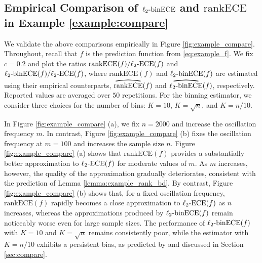 \documentclass[11pt]{article}
\numberwithin{equation}{section}
\theoremstyle{definition}
\newcommand{\myoverline}[2][3.5em]{%
  \overset{%
    \tikz[baseline=-0.1ex]{
      \draw[line width=0.75pt]
        (0,0) .. controls (#1/2,0.5ex) .. (#1,0);
    }%
  }{#2}%
}
\newcommand{\ECE}{\mathrm{ECE}}
\newcommand{\lECE}{\ell_2\textnormal{-}\ECE}
\newcommand{\binECE}{\mathrm{binECE}}
\newcommand{\lbinECE}{\ell_2\textnormal{-}\binECE}
\newcommand{\binhatECE}{\myoverline{\lbinECE}}
\newcommand{\rankECE}{\mathrm{rankECE}}
\newcommand{\hatrankECE}{\myoverline{\rankECE}}
\begin{document}
\subsection{Empirical Comparison of $\lbinECE$ and $\rankECE$ in Example \ref{example:compare}}
We validate the above comparisons empirically in Figure \ref{fig:example_compare}. Throughout, recall that $f$ is the prediction function from \eqref{eq:example_f}. We fix $c=0.2$ and plot the ratios $\rankECE(f)/\lECE(f)$ and $\lbinECE(f)/\lECE(f)$, where $\rankECE(f)$ and $\lbinECE(f)$ are estimated using their empirical counterparts, $\hatrankECE(f)$ and $\binhatECE(f)$, respectively. Reported values are averaged over $50$ repetitions. For the binning estimator, we consider three choices for the number of bins: $K=10$, $K=\sqrt{n}$, and $K=n/10$.

In Figure \ref{fig:example_compare} (a), we fix $n=2000$ and increase the oscillation frequency $m$. In contrast, Figure \ref{fig:example_compare} (b) fixes the oscillation frequency at $m=100$ and increases the sample size $n$. Figure \ref{fig:example_compare} (a) shows that $\rankECE(f)$ provides a substantially better approximation to $\lECE(f)$ for moderate values of $m$. As $m$ increases, however, the quality of the approximation gradually deteriorates, consistent with the prediction of Lemma \ref{lemma:example_rank_bd}. By contrast, Figure \ref{fig:example_compare} (b) shows that, for a fixed oscillation frequency, $\rankECE(f)$ rapidly becomes a close approximation to $\lECE(f)$ as $n$ increases, whereas the approximations produced by $\lbinECE(f)$ remain noticeably worse even for large sample sizes. The performance of $\lbinECE(f)$ with $K=10$ and $K = \sqrt{n}$ remains consistently poor, while the estimator with $K=n/10$ exhibits a persistent bias, as predicted by \cite{futami2024information} and discussed in Section \ref{sec:compare}.
\end{document}

